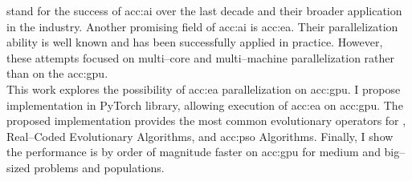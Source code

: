\documentclass[12pt]{report}
\begin{document}
 stand for the success of \acrlong*{acc:ai} over the last decade and their broader application in the industry. Another promising field of \acrlong*{acc:ai} is \acrlong*{acc:ea}. Their parallelization ability is well known and has been successfully applied in practice. However, these attempts focused on multi--core and multi--machine parallelization rather than on the \acrshort*{acc:gpu}.\\
This work explores the possibility of \acrlong*{acc:ea} parallelization on \acrshort*{acc:gpu}. I propose implementation in PyTorch library, allowing execution of \acrshort*{acc:ea} on \acrshort*{acc:gpu}. The proposed implementation provides the most common evolutionary operators for , Real--Coded Evolutionary Algorithms, and \acrlong*{acc:pso} Algorithms. Finally, I show the performance is by order of magnitude faster on \acrshort*{acc:gpu} for medium and big--sized problems and populations.
\end{document}

